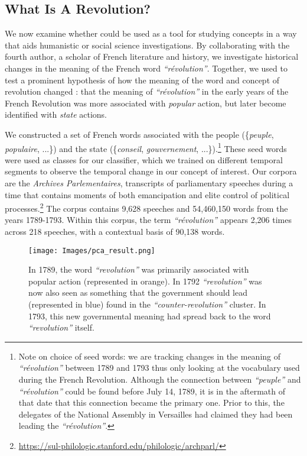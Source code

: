 \subsection{What Is A Revolution?}

We now examine whether \wc could be used as a tool for studying concepts in a way that aids humanistic or social science investigations. By collaborating with the fourth author, a scholar of French literature and history, we investigate historical changes in the meaning of the French word \textit{``révolution''}. Together, we used \wc to test a prominent hypothesis of how the meaning of the word and concept of revolution changed \cite{baker_1990}: that the meaning of \textit{``révolution''} in the early years of the French Revolution was more associated with \textit{popular} action, but later become identified with \textit{state} actions.

We constructed a set of French words associated with the people (\{\textit{peuple}, \textit{populaire}, ...\}) and the state (\{\textit{conseil}, \textit{gouvernement}, ...\}).\footnote{Note on choice of seed words: we are tracking changes in the meaning of \textit{``révolution''} between 1789 and 1793 thus only looking at the vocabulary used during the French Revolution. Although the connection between \textit{``peuple''} and \textit{``révolution''} could be found before July 14, 1789, it is in the aftermath of that date that this connection became the primary one. Prior to this, the delegates of the National Assembly in Versailles had claimed they had been leading the \textit{``révolution''}.} These seed words were used as classes for our classifier, which we trained on different temporal segments to observe the temporal change in our concept of interest. Our corpora are the \textit{Archives Parlementaires}, transcripts of parliamentary speeches during a time that contains moments of both emancipation and elite control of political processes.\footnote{\url{https://sul-philologic.stanford.edu/philologic/archparl/}} The corpus contains 9,628 speeches and 54,460,150 words from the years 1789-1793. Within this corpus, the term \textit{``révolution''} appears 2,206 times across 218 speeches, with a contextual basis of 90,138 words.

\begin{figure}[h!]
    \texttt{[image: Images/pca\_result.png]}
    \caption{In 1789, the word \textit{``revolution''} was primarily associated with popular action (represented in orange). In 1792 \textit{``revolution''} was now also seen as something that the government should lead (represented in blue) found in the \textit{``counter-revolution''} cluster. In 1793, this new governmental meaning had spread back to the word \textit{``revolution''} itself.
    }
    \label{fig:revolution}
\end{figure}


